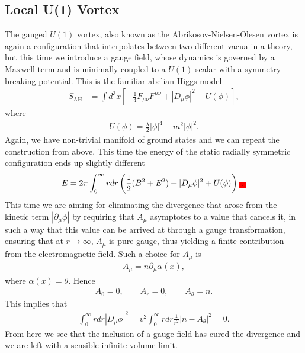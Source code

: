         \subsection{Local U(1) Vortex}
        The gauged $U(1)$ vortex, also known as the Abrikosov-Nielsen-Olesen vortex is again a configuration that interpolates between two different vacua in a theory, but this time we introduce a gauge field, whose dynamics is governed by a Maxwell term and is minimally coupled to a $U(1)$ scalar with a symmetry breaking potential. This is the familiar abelian Higgs model\colorbox{red}{ }
        \begin{align}
            S_{\text{AH}} & = \int d^3x \left[-\frac{1}{4} F_{\mu \nu} F^{\mu \nu} + | D_{\mu} \phi|^2 - U(\phi) \right], \label{eq:Abelian_Higgs_Model}
        \end{align}
        where
        \begin{align}
            U(\phi) = \frac{\lambda}{2} |\phi|^4 - m^2 |\phi|^2.
        \end{align}
    Again, we have non-trivial manifold of ground states and we can repeat the construction from above. This time the energy of the static radially symmetric configuration ends up slightly different\colorbox{red}{ }
    \begin{align}
        E = 2 \pi \int_0^{\infty} r dr \left(\frac{1}{2}( B^2 + E^2) + |D_{\mu} \phi|^2 + U(\phi) \right) \colorbox{red}{.}
    \end{align}
    This time we are aiming for eliminating the divergence that arose from the kinetic term $|\partial_{\mu}\phi|$ by requiring that $A_{\mu}$ asymptotes to a value that cancels it, in such a way that this value can be arrived at through a gauge transformation, ensuring that at $r\rightarrow \infty$, $A_{\mu}$ is pure gauge, thus yielding a finite contribution from the electromagnetic field. Such a choice for $A_{\mu}$ is
    \begin{align}
        A_{\mu} = n \partial_{\mu} \alpha(x),
    \end{align}
    where $\alpha(x) = \theta$. Hence
    \begin{align}
        A_0 =0, \qquad A_r =0, \qquad A_{\theta} = n.
    \end{align}
    This implies that
    \begin{align}
        \int_0^{\infty} r dr |D_{\mu}\phi|^2 = v^2\int_0^{\infty} r dr  \frac{1}{r^2}|n-A_{\theta}|^2 =0.
    \end{align}
    From here we see that the inclusion of a gauge field has cured the divergence and we are left with a sensible infinite volume limit. 

